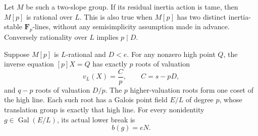 \begin{lemma}
\label{lem:B-RD73-high-branch}
Let \(M\) be such a two-slope group. If its residual inertia action
is tame, then \(M[p]\) is rational over \(L\).
This is also true when \(M[p]\) has two distinct inertia-stable
\(\mathbf F_p\)-lines, without any semisimplicity assumption made
in advance. Conversely rationality over \(L\) implies \(p\mid D\).

Suppose \(M[p]\) is \(L\)-rational and \(D<e\).
For any nonzero high point \(Q\), the inverse equation \([p]X=Q\)
has exactly \(p\) roots of valuation
\[
 v_L(X)=\frac{C}{p},\qquad C=s-pD,
 \tag{B-RD73.2}
\]
and \(q-p\) roots of valuation \(D/p\).
The \(p\) higher-valuation roots form one coset of the high line.
Each such root has a Galois point field \(E/L\) of degree \(p\),
whose translation group is exactly that high line.
For every nonidentity \(g\in\operatorname{Gal}(E/L)\), its actual
lower break is
\[
 b(g)=eN.
 \tag{B-RD73.3}
\]
\end{lemma}
